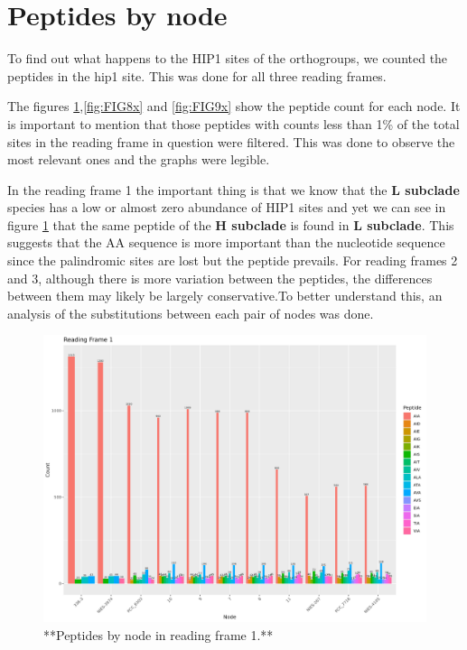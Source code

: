 \documentclass[
]{book}
\begin{document}
\hypertarget{peptides-by-node-1}{%
\section{Peptides by node}\label{peptides-by-node-1}}

To find out what happens to the HIP1 sites of the orthogroups, we counted the peptides in the hip1 site. This was done for all three reading frames.

The figures \ref{fig:FIG7x},\ref{fig:FIG8x} and \ref{fig:FIG9x} show the peptide count for each node. It is important to mention that those peptides with counts less than 1\% of the total sites in the reading frame in question were filtered. This was done to observe the most relevant ones and the graphs were legible.

In the reading frame 1 the important thing is that we know that the \textbf{L subclade} species has a low or almost zero abundance of HIP1 sites and yet we can see in figure \ref{fig:FIG7x} that the same peptide of the \textbf{H subclade} is found in \textbf{L subclade}. This suggests that the AA sequence is more important than the nucleotide sequence since the palindromic sites are lost but the peptide prevails. For reading frames 2 and 3, although there is more variation between the peptides, the differences between them may likely be largely conservative.To better understand this, an analysis of the substitutions between each pair of nodes was done.

\begin{figure}
\includegraphics[width=1\linewidth]{figures/Peptides_RF1} \caption{**Peptides by node in reading frame 1.**}\label{fig:FIG7x}
\end{figure}
\end{document}

